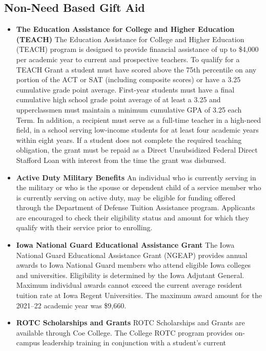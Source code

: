 \documentclass[
  letterpaper,
]{scrbook}
\begin{document}
\subsection{Non-Need Based Gift Aid}\label{non-need-based-gift-aid}

\begin{itemize}
\item
  \textbf{The Education Assistance for College and Higher Education
  (TEACH)} The Education Assistance for College and Higher Education
  (TEACH) program is designed to provide financial assistance of up to
  \$4,000 per academic year to current and prospective teachers. To
  qualify for a TEACH Grant a student must have scored above the 75th
  percentile on any portion of the ACT or SAT (including composite
  scores) or have a 3.25 cumulative grade point average. First-year
  students must have a final cumulative high school grade point average
  of at least a 3.25 and upperclassmen must maintain a minimum
  cumulative GPA of 3.25 each Term. In addition, a recipient must serve
  as a full-time teacher in a high-need field, in a school serving
  low-income students for at least four academic years within eight
  years. If a student does not complete the required teaching
  obligation, the grant must be repaid as a Direct Unsubsidized Federal
  Direct Stafford Loan with interest from the time the grant was
  disbursed.
\item
  \textbf{Active Duty Military Benefits} An individual who is currently
  serving in the military or who is the spouse or dependent child of a
  service member who is currently serving on active duty, may be
  eligible for funding offered through the Department of Defense Tuition
  Assistance program. Applicants are encouraged to check their
  eligibility status and amount for which they qualify with their
  service prior to enrolling.
\item
  \textbf{Iowa National Guard Educational Assistance Grant} The Iowa
  National Guard Educational Assistance Grant (NGEAP) provides annual
  awards to Iowa National Guard members who attend eligible Iowa
  colleges and universities. Eligibility is determined by the Iowa
  Adjutant General. Maximum individual awards cannot exceed the current
  average resident tuition rate at Iowa Regent Universities. The maximum
  award amount for the 2021--22 academic year was \$9,660.
\item
  \textbf{ROTC Scholarships and Grants} ROTC Scholarships and Grants are
  available through Coe College. The College ROTC program provides
  on-campus leadership training in conjunction with a student's current

\end{itemize}
\end{document}
